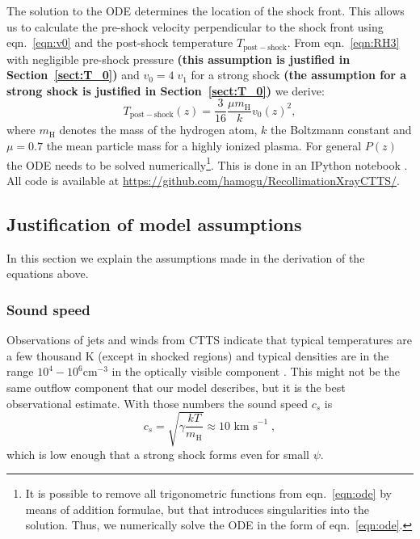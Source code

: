 \documentclass[manuscript]{aastex}
\begin{document}
The solution to the ODE determines the location of the shock front. This allows us to calculate the pre-shock velocity perpendicular to the shock front using eqn.~\ref{eqn:v0} and the post-shock temperature $T_{\mathrm{post-shock}}$. From eqn.~\ref{eqn:RH3} with negligible pre-shock pressure \textbf{(this assumption is justified in Section~\ref{sect:T_0})} and $v_0=4\;v_1$ for a strong shock \textbf{(the assumption for a strong shock is justified in Section~\ref{sect:T_0})} we derive:
\begin{equation}
T_{\mathrm{post-shock}}(z) = \frac{3}{16} \frac{\mu m_{\textrm{H}}}{k} v_0(z)^2,\label{eqn:T}
\end{equation}
where $m_{\textrm{H}}$ denotes the mass of the hydrogen atom, $k$ the Boltzmann constant and $\mu=0.7$ the mean particle mass for a highly ionized plasma. For general $P(z)$ the ODE needs to be solved numerically\footnote{It is possible to remove all trigonometric functions from eqn.~\ref{eqn:ode} by means of addition formulae, but that introduces singularities into the solution. Thus, we numerically solve the ODE in the form of eqn.~\ref{eqn:ode}.}. This is done in an IPython notebook \citep{PER-GRA:2007}. All code is available at \url{https://github.com/hamogu/RecollimationXrayCTTS/}.


\subsection{Justification of model assumptions}
\label{sect:modelassumptions}
In this section we explain the assumptions made in the derivation of the equations above.

\subsubsection{Sound speed}
\label{sect:soundspeed}
Observations of jets and winds from CTTS indicate that typical temperatures are a few thousand K (except in shocked regions) and typical densities are in the range $10^4-10^6 \mathrm{ cm}^{-3}$ in the optically visible component \citep[e.g.][]{2000A&A...356L..41L,2007ApJ...657..897K}. This might not be the same outflow component that our model describes, but it is the best observational estimate. With those numbers the sound speed $c_s$ is
\begin{equation}
c_s = \sqrt{\gamma \frac{k T}{m_{\textrm{H}}}} \approx 10 \textrm{ km s}^{-1} \; ,
\end{equation}
which is low enough that a strong shock forms even for small $\psi$.
\end{document}
